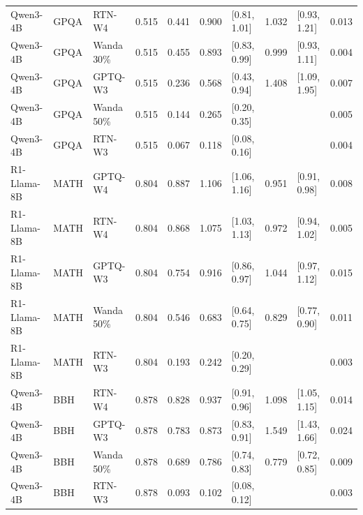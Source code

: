 \begin{tabular}{lllrrrlrlr}
Qwen3-4B & GPQA & RTN-W4 & 0.515 & 0.441 & 0.900 & [0.81, 1.01] & 1.032 & [0.93, 1.21] & 0.013 \\
Qwen3-4B & GPQA & Wanda 30\% & 0.515 & 0.455 & 0.893 & [0.83, 0.99] & 0.999 & [0.93, 1.11] & 0.004 \\
Qwen3-4B & GPQA & GPTQ-W3 & 0.515 & 0.236 & 0.568 & [0.43, 0.94] & 1.408 & [1.09, 1.95] & 0.007 \\
Qwen3-4B & GPQA & Wanda 50\% & 0.515 & 0.144 & 0.265 & [0.20, 0.35] &  &  & 0.005 \\
Qwen3-4B & GPQA & RTN-W3 & 0.515 & 0.067 & 0.118 & [0.08, 0.16] &  &  & 0.004 \\
R1-Llama-8B & MATH & GPTQ-W4 & 0.804 & 0.887 & 1.106 & [1.06, 1.16] & 0.951 & [0.91, 0.98] & 0.008 \\
R1-Llama-8B & MATH & RTN-W4 & 0.804 & 0.868 & 1.075 & [1.03, 1.13] & 0.972 & [0.94, 1.02] & 0.005 \\
R1-Llama-8B & MATH & GPTQ-W3 & 0.804 & 0.754 & 0.916 & [0.86, 0.97] & 1.044 & [0.97, 1.12] & 0.015 \\
R1-Llama-8B & MATH & Wanda 50\% & 0.804 & 0.546 & 0.683 & [0.64, 0.75] & 0.829 & [0.77, 0.90] & 0.011 \\
R1-Llama-8B & MATH & RTN-W3 & 0.804 & 0.193 & 0.242 & [0.20, 0.29] &  &  & 0.003 \\
Qwen3-4B & BBH & RTN-W4 & 0.878 & 0.828 & 0.937 & [0.91, 0.96] & 1.098 & [1.05, 1.15] & 0.014 \\
Qwen3-4B & BBH & GPTQ-W3 & 0.878 & 0.783 & 0.873 & [0.83, 0.91] & 1.549 & [1.43, 1.66] & 0.024 \\
Qwen3-4B & BBH & Wanda 50\% & 0.878 & 0.689 & 0.786 & [0.74, 0.83] & 0.779 & [0.72, 0.85] & 0.009 \\
Qwen3-4B & BBH & RTN-W3 & 0.878 & 0.093 & 0.102 & [0.08, 0.12] &  &  & 0.003 \\
\bottomrule
\end{tabular}
